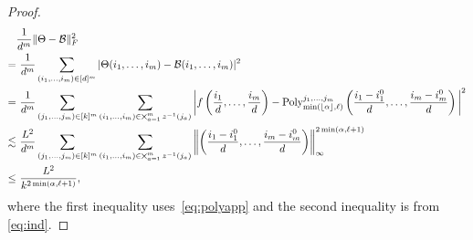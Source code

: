 \documentclass[12pt]{article}
\theoremstyle{definition}
\begin{document}
\begin{proof}
\begin{align}
   & \frac{1}{d^m}\FnormSize{}{\Theta-\tB}^2\\
=&\ \frac{1}{d^m} \sum_{(i_1,\ldots,i_m)\in[d]^m}|\Theta(i_1,\ldots,i_m)-\tB(i_1,\ldots,i_m)|^2\\
=&\ \frac{1}{d^m}\sum_{(j_1,\ldots,j_m)\in[k]^m}\sum_{(i_1,\ldots,i_m)\in \bigtimes_{a=1}^m z^{-1}(j_a)}\bigg|f\left(\frac{i_1}{d},\ldots,\frac{i_m}{d}\right)-\text{Poly}^{j_1,\ldots,j_m}_{\min(\lfloor \alpha \rfloor,\ell)}\left(\frac{i_1-i_1^0}{d},\ldots,\frac{i_m-i_m^0}{d}\right)\bigg|^2\\
    \lesssim &\ \frac{L^2}{d^m}\sum_{(j_1,\ldots,j_m)\in[k]^m}\sum_{(i_1,\ldots,i_m)\in \bigtimes_{a=1}^m z^{-1}(j_a)} \left\|\left(\frac{i_1-i_1^0}{d},\ldots,\frac{i_m-i_m^0}{d}\right)\right\|_\infty^{2\min(\alpha,\ell+1)}\\
    \leq&\ \frac{L^2}{k^{2\min(\alpha,\ell+1)}},
\end{align}
where the first inequality uses~\eqref{eq:polyapp} and the second inequality is from \eqref{eq:ind}.
\end{proof}
\end{document}
